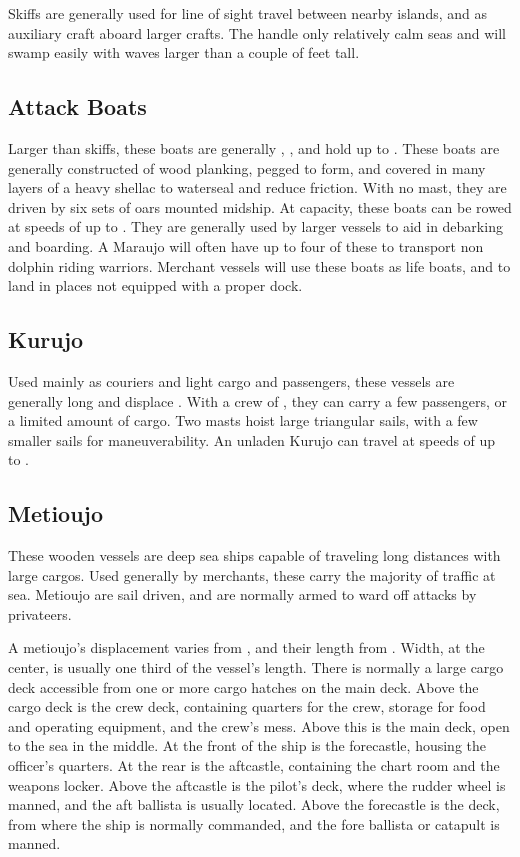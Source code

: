 \begin{multicols*}{2}
Skiffs are generally used for line of sight travel between nearby islands, and as auxiliary craft aboard larger crafts. The handle only relatively calm seas and will swamp
easily with waves larger than a couple of feet tall.
\subsection{Attack Boats}
Larger than skiffs, these boats are generally , , and hold up to . These boats are generally constructed of wood planking, pegged to form, and covered in many layers of a heavy shellac to waterseal and reduce friction. With no mast, they are driven by six sets of oars mounted midship. At capacity, these boats can be rowed at speeds of up to . They are generally used by larger vessels to aid in debarking and boarding. A Maraujo will often have up to four of these to transport non dolphin riding warriors. Merchant vessels will use these boats as life boats, and to land in places not equipped with a proper dock.
\subsection{Kurujo}
Used mainly as couriers and light cargo and passengers, these vessels are generally  long and displace . With a crew of , they can carry a few passengers, or a limited amount of cargo. Two masts hoist large triangular sails, with a few smaller sails for maneuverability. An unladen Kurujo can travel at speeds of up to .
\subsection{Metioujo}
These wooden vessels are deep sea ships capable of traveling long distances with large cargos. Used generally by merchants, these carry the majority of traffic at sea. Metioujo are sail driven, and are normally armed to ward off attacks by privateers.

A metioujo's displacement varies from , and their length from . Width, at the center, is usually one third of the vessel's length. There is normally a large cargo deck accessible from one or more cargo hatches on the main deck. Above the cargo deck is the crew deck, containing quarters for the crew, storage for food and operating equipment, and the crew's mess. Above this is the main deck, open to the sea in the middle. At the front of the ship is the forecastle, housing the officer's quarters. At the
rear is the aftcastle, containing the chart room and the weapons locker. Above the aftcastle is the pilot's deck, where the rudder wheel is manned, and the aft ballista is usually
located. Above the forecastle is the  deck, from where the ship is normally commanded, and the fore ballista or catapult is manned.


\end{multicols*}

